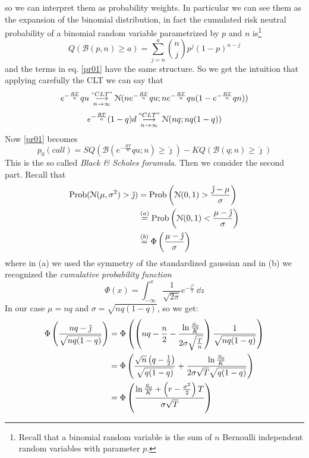 so we can interpret them as probability weights. In particular we can see them as the expansion of the binomial distribution, in fact the cumulated risk neutral probability of a binomial random variable parametrized by $p$ and $n$ is\footnote{Recall that a binomial random variable is the sum of $n$ Bernoulli independent random variables with parameter $p$.}
\begin{equation}
    Q(\mathcal{B}(p,n)\ge a) = \sum_{j=n}^a\binom{n}{j}p^j(1-p)^{n-j}
\end{equation}
and the terms in eq. \eqref{pr01} have the same structure. So we get the intuition that applying carefully the CLT we can say that
\begin{equation}
    e^{-\frac{RT}{n}}qu \overset{``CLT"}{\underset{n\to\infty}{\longrightarrow}}\mathcal{N}(ne^{-\frac{RT}{n}}qu;ne^{-\frac{RT}{n}}qu(1-e^{-\frac{RT}{n}}qn))
\end{equation}
\begin{equation}
    e^{-\frac{RT}{n}}(1-q)d \overset{``CLT"}{\underset{n\to\infty}{\longrightarrow}} \mathcal{N}(nq;nq(1-q))
\end{equation}
Now \eqref{pr01} becomes
\begin{equation}\label{pr02}
    p_0(call) = SQ(\mathcal{B}(e^{-\frac{RT}{n}}qu;n)\ge\hat{\jmath})-KQ(\mathcal{B}(q;n)\ge\hat{\jmath})
\end{equation}
This is the so called \emph{Black \& Scholes forumula}. Then we consider the second part. Recall that
\begin{align}
    \notag \operatorname{Prob}(\mathcal{N}(\mu,\sigma^2)>\hat{\jmath}) 
    &=
    \operatorname{Prob}\left(\mathcal{N}(0,1)>\dfrac{\hat{\jmath}-\mu}{\sigma}\right) \\
    &\overset{(a)}{=} \notag \operatorname{Prob}\left(\mathcal{N}(0,1)<\dfrac{\mu-\hat{\jmath}}{\sigma}\right) \\
    &\overset{(b)}{=} \Phi\left(\dfrac{\mu-\hat{\jmath}}{\sigma}\right)
\end{align}
where in (a) we used the symmetry of the standardized gaussian and in (b) we recognized the \emph{cumulative probability function}
\begin{equation}
\Phi(x)=\int^{x}_{-\infty}\frac{1}{\sqrt{2\pi}}e^{-\frac{z^2}{2}}\,\dd z
\end{equation}
In our case $\mu=nq$ and $\sigma=\sqrt{nq(1-q)}$, so we get:
\begin{align}
    \notag\Phi\left(\dfrac{nq-\hat{\jmath}}{\sqrt{nq(1-q)}}\right) 
    &= \Phi\left(\left(nq-\dfrac{n}{2}-\dfrac{\ln\frac{S_0}{K}}{2\sigma\sqrt{\frac{T}{n}}}\right)\dfrac{1}{\sqrt{nq(1-q)}}\right) \\
    &= 
    \notag\Phi\left(
    \dfrac{\sqrt{n}\left(q-\frac{1}{2}\right)}{\sqrt{q(1-q)}} + \dfrac{\ln\frac{S_0}{K}}{2\sigma\sqrt{T}\sqrt{q(1-q)}}
    \right)\\
    &=
    \Phi\left(
    \dfrac{\ln\frac{S_0}{K}+\left(r-\frac{\sigma^2}{2}\right)T}{\sigma\sqrt{T}}
    \right)
\end{align}
